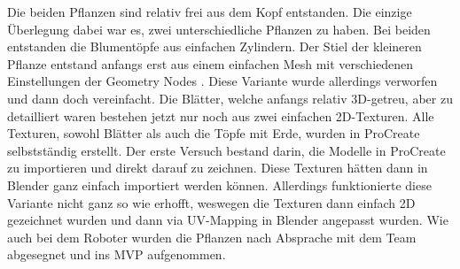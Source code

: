 Die beiden Pflanzen sind relativ frei aus dem Kopf entstanden. Die einzige Überlegung dabei war es, zwei unterschiedliche Pflanzen zu haben. Bei beiden entstanden die Blumentöpfe aus einfachen Zylindern. Der Stiel der kleineren Pflanze entstand anfangs erst aus einem einfachen Mesh mit verschiedenen Einstellungen der Geometry Nodes \cite{Geometry_Node_Tutorial}. Diese Variante wurde allerdings verworfen und dann doch vereinfacht. Die Blätter, welche anfangs relativ 3D-getreu, aber zu detailliert waren bestehen jetzt nur noch aus zwei einfachen 2D-Texturen. Alle Texturen, sowohl Blätter als auch die Töpfe mit Erde, wurden in ProCreate selbstständig erstellt. Der erste Versuch bestand darin, die Modelle in ProCreate zu importieren und direkt darauf zu zeichnen. Diese Texturen hätten dann in Blender ganz einfach importiert werden können. Allerdings funktionierte diese Variante nicht ganz so wie erhofft, weswegen die Texturen dann einfach 2D gezeichnet wurden und dann via UV-Mapping in Blender angepasst wurden. Wie auch bei dem Roboter wurden die Pflanzen nach Absprache mit dem Team abgesegnet und ins MVP aufgenommen. 
